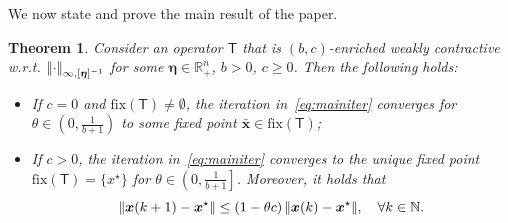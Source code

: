 \documentclass[journal,twoside,web]{ieeecolor}
\newcommand{\norm}[1]{{\left\vert\kern-0.25ex\left\vert #1\right\vert\kern-0.25ex\right\vert}}
\newcommand{\nat}{\mathbb{N}}
\newcommand{\xb}{\boldsymbol{x}}
\newcommand{\etab}{\boldsymbol{\eta}}
\newcommand{\Ts}{\mathsf{T}}
\newcommand{\fix}{\mathrm{fix}}
\newtheorem{thm}{Theorem}
\begin{document}
We now state and prove the main result of the paper.
%
\begin{thm}\label{thm:nonlin-bene}
    Consider an operator $\Ts$ that is $(b,c)$-enriched weakly contractive w.r.t. $\norm{\cdot}_{\infty,[\etab]^{-1}}$
    for some $\etab \in \mathbb{R}^n_{+}$, $b> 0$, $c\geq 0$. Then the following holds:
    \begin{itemize}
        \item[(a)] If $c=0$ and ${\fix(\Ts)\neq \emptyset}$, the iteration in~\eqref{eq:mainiter} converges for ${\theta\in\left(0,\frac{1}{b+1}\right)}$ to some fixed point $\bar{\xb}\in \fix (\Ts)$;
        \item[(b)] If $c>0$, the iteration in~\eqref{eq:mainiter} converges to the unique fixed point $\fix(\Ts)=\{x^\star\}$ for ${\theta\in\left(0,\frac{1}{b+1}\right]}$. Moreover, it holds that
        $$
        \norm{\xb(k+1)-\xb^\star}\leq \left(1-\theta c\right)\norm{\xb(k)-\xb^\star}, \quad \forall k\in\nat.
        $$
    \end{itemize}
\end{thm}
%
\end{document}
